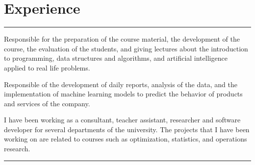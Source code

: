 \documentclass[]{rahulworld-resume}
\begin{document}
\begin{minipage}[t]{0.66\textwidth}
\vspace{5pt}
\section{Experience}

\noindent\rule{12.5cm}{0.4pt}

\noindent
\hspace{5em}%
\begin{minipage}{0.85\textwidth\vspace{2pt}}
Responsible for the preparation of the course material,
the development of the course, the evaluation of the students,
and giving lectures about the introduction to programming,
data structures and algorithms, and artificial intelligence applied
to real life problems.

\end{minipage}

\noindent
\hspace{5em}%
\begin{minipage}{0.85\textwidth\vspace{2pt}}
Responsible of the development of daily reports, analysis of the data,
and the implementation of machine learning models to predict the
behavior of products and services of the company.
\end{minipage}
\sectionsep


\noindent
\hspace{5em}%
\begin{minipage}{0.85\textwidth\vspace{2pt}}
I have been working as a consultant, teacher assistant, researcher
and software developer for several departments of the university.
The projects that I have been working on are related to courses such as optimization, statistics, and operations research.
\end{minipage}
\noindent\rule{12.5cm}{0.4pt}
\sectionsep


\end{minipage}
\end{document}
